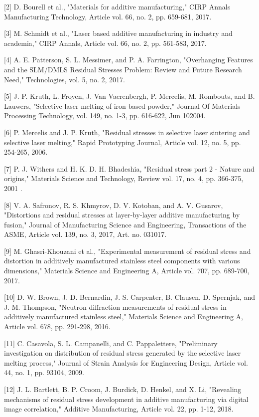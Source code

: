 \documentclass[10pt]{article}
\begin{document}
[2] D. Bourell et al., "Materials for additive manufacturing," CIRP Annals Manufacturing Technology, Article vol. 66, no. 2, pp. 659-681, 2017.

[3] M. Schmidt et al., "Laser based additive manufacturing in industry and academia," CIRP Annals, Article vol. 66, no. 2, pp. 561-583, 2017.

[4] A. E. Patterson, S. L. Messimer, and P. A. Farrington, "Overhanging Features and the SLM/DMLS Residual Stresses Problem: Review and Future Research Need," Technologies, vol. 5, no. 2, 2017.

[5] J. P. Kruth, L. Froyen, J. Van Vaerenbergh, P. Mercelis, M. Rombouts, and B. Lauwers, "Selective laser melting of iron-based powder," Journal Of Materials Processing Technology, vol. 149, no. 1-3, pp. 616-622, Jun 102004.

[6] P. Mercelis and J. P. Kruth, "Residual stresses in selective laser sintering and selective laser melting," Rapid Prototyping Journal, Article vol. 12, no. 5, pp. 254-265, 2006.

[7] P. J. Withers and H. K. D. H. Bhadeshia, "Residual stress part 2 - Nature and origins," Materials Science and Technology, Review vol. 17, no. 4, pp. 366-375, 2001 .

[8] V. A. Safronov, R. S. Khmyrov, D. V. Kotoban, and A. V. Gusarov, "Distortions and residual stresses at layer-by-layer additive manufacturing by fusion," Journal of Manufacturing Science and Engineering, Transactions of the ASME, Article vol. 139, no. 3, 2017, Art. no. 031017.

[9] M. Ghasri-Khouzani et al., "Experimental measurement of residual stress and distortion in additively manufactured stainless steel components with various dimensions," Materials Science and Engineering A, Article vol. 707, pp. 689-700, 2017.

[10] D. W. Brown, J. D. Bernardin, J. S. Carpenter, B. Clausen, D. Spernjak, and J. M. Thompson, "Neutron diffraction measurements of residual stress in additively manufactured stainless steel," Materials Science and Engineering A, Article vol. 678, pp. 291-298, 2016.

[11] C. Casavola, S. L. Campanelli, and C. Pappalettere, "Preliminary investigation on distribution of residual stress generated by the selective laser melting process," Journal of Strain Analysis for Engineering Design, Article vol. 44, no. 1, pp. 93104, 2009.

[12] J. L. Bartlett, B. P. Croom, J. Burdick, D. Henkel, and X. Li, "Revealing mechanisms of residual stress development in additive manufacturing via digital image correlation," Additive Manufacturing, Article vol. 22, pp. 1-12, 2018.
\end{document}
